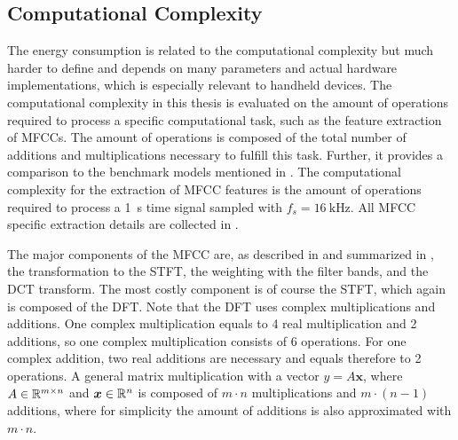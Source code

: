 
\subsection{Computational Complexity}\label{sec:signal_mfcc_complexity}
The energy consumption is related to the computational complexity but much harder to define and depends on many parameters and actual hardware implementations, which is especially relevant to handheld devices.
The computational complexity in this thesis is evaluated on the amount of operations required to process a specific computational task, such as the feature extraction of MFCCs.
The amount of operations is composed of the total number of additions and multiplications necessary to fulfill this task.
Further, it provides a comparison to the benchmark models mentioned in .
The computational complexity for the extraction of MFCC features is the amount of operations required to process a \SI{1}{\second} time signal sampled with $f_s = \SI{16}{\kilo\hertz}$.
All MFCC specific extraction details are collected in .

The major components of the MFCC are, as described in  and summarized in , the transformation to the STFT, the weighting with the filter bands, and the DCT transform.
The most costly component is of course the STFT, which again is composed of the DFT.
Note that the DFT uses complex multiplications and additions.
One complex multiplication equals to 4 real multiplication and 2 additions, so one complex multiplication consists of 6 operations.
For one complex addition, two real additions are necessary and equals therefore to 2 operations.
A general matrix multiplication with a vector $y = A \bm{x}$, where $A \in \mathbb{R}^{m \times n}$ and $\bm{x} \in \mathbb{R}^n$ is composed of $m \cdot n$ multiplications and $m \cdot (n - 1)$ additions, where for simplicity the amount of additions is also approximated with $m \cdot n$.

